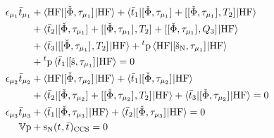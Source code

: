 \begin{subequations}\label{eq:ptes-cc3-multipliers}
  \begin{align}
    \epsilon_{\mu_1}\bar{t}_{\mu_1} &+
     \braket{\mathrm{HF} | [ \check{\Phi}, \tau_{\mu_1} ]^{} | \mathrm{HF}}
   + \braket{\bar{t}_{1} |
       [ \check{\Phi}, \tau_{\mu_1} ]^{}
     + [ [ \check{\Phi}, \tau_{\mu_1} ]^{}, T_2 ]^{}
     | \mathrm{HF}} \nonumber \\
   &+ \braket{\bar{t}_{2} |
       [ \check{\Phi}, \tau_{\mu_1} ]^{}
     + [ [ \check{\Phi}, \tau_{\mu_1} ]^{}, T_2 ]^{}
     + [ [ \check{\Phi}, \tau_{\mu_1} ]^{}, Q_3 ]^{}
   | \mathrm{HF}} \nonumber \\
   &+ \braket{\bar{t}_{3} |
      [ [ \check{\Phi}, \tau_{\mu_1} ]^{}, T_2 ]^{}
     | \mathrm{HF}}
   + {}^t\mathrm{p}\braket{\mathrm{HF} |
   [ \check{\mathrm{s}}_\mathrm{N}, \tau_{\mu_1} ]^{} | \mathrm{HF}}  \nonumber \\
   &+ {}^t\mathrm{p}\braket{\bar{t}_{1} | [ \check{\mathrm{s}}, \tau_{\mu_1} ]^{} | \mathrm{HF}}
     = 0 \label{eq:ptes-cc3-singles-multipliers} \\
    \epsilon_{\mu_2}\bar{t}_{\mu_2} &+
    \braket{\mathrm{HF} | [ \check{\Phi}, \tau_{\mu_2} ]^{} | \mathrm{HF}}
   + \braket{\bar{t}_{1} |
       [ \check{\Phi}, \tau_{\mu_2} ]^{}
     | \mathrm{HF}} \nonumber \\
  &+ \braket{\bar{t}_{2} |
       [ \check{\Phi}, \tau_{\mu_2} ]^{}
     + [ [ \check{\Phi}, \tau_{\mu_2} ]^{}, T_2 ]^{}
     | \mathrm{HF}}
  + \braket{\bar{t}_{3} |
       [ \check{\Phi}, \tau_{\mu_2} ]^{}
     | \mathrm{HF}}
    = 0 \label{eq:ptes-cc3-doubles-multipliers} \\
    \epsilon_{\mu_3}\bar{t}_{\mu_3} &+
    \braket{\bar{t}_{1} |
       [ \check{\Phi}, \tau_{\mu_3} ]^{}
     | \mathrm{HF}}
  + \braket{\bar{t}_{2} |
       [ \check{\Phi}, \tau_{\mu_3} ]^{}
     | \mathrm{HF}}
    = 0 \label{eq:ptes-cc3-triples-multipliers} \\
    \mathbb{V}\mathrm{p} &+ \mathrm{s}_{\mathrm{N}}(t_{}, \bar{t}_{})_\mathrm{CCS} = 0
    \label{eq:ptes-cc3-polarization-mult}
  \end{align}
\end{subequations}
